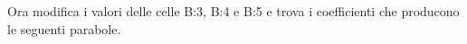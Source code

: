 \begin{comment}
\begin{procedura}
 Per far disegnare parabole ad un foglio di calcolo.
 \begin{enumerate*}
  \item Crea un nuovo foglio di calcolo e salvalo con il 
   nome~``pcoefficientiparabola''.
  \item Intestazioni varie:
   \subitem <A1>: Coefficienti della parabola
   \subitem <D1>: <menu-Inserisci-Oggetto-Formula...> ax\^{}2+bx+c
   \subitem <A3>: a
   \subitem <A3>: <Clic destro - Inserisci commento> Coefficiente termine di 
    secondo grado.
   \subitem <A4>: b
   \subitem <A4>: <Clic destro - Inserisci commento> Coefficiente termine di 
    primo grado.
   \subitem <A5>: c
   \subitem <A5>: <Clic destro - Inserisci commento> Coefficiente termine di 
    grado zero.
   \subitem <A7>: x
   \subitem <b7>: y
  \item Dati
   \subitem <B3>: -0,5
   \subitem <B4>: 1
   \subitem <B3>: 1
   \subitem <A8>: -10
   \subitem <A9>: -9,5
   \subitem seleziona <A8:A9>: una cifra decimale, 
    copia verso il basso fino a <A48>
   \subitem <B8>: =B\$3*A8\^2+B\$4*A8+B\$5 (attento ai simboli \$ che 
   indicano i
    riferimenti assoluti)
   \subitem <B8>: 3 cifre decimali, copia verso il basso fino ad <b48>
  \item Grafico
   \subitem seleziona <A8:B48>
   \subitem <menu-Inserisci-Grafico>
   \subitem XY (Dispersione), Tipo linea: Liscia, Solo linee.
   \subitem Titolo: Parabola nel piano cartesiano
   \subitem Togli la spunta a: Mostra legenda.
   \subitem Metti la spunta a Mostra griglie Asse X e Asse Y.
   \subitem Doppio clic su un numero dell'asse y: 
    <Scala> Minimo -10, Massimo 10, Intervallo principale 1;
    <Linea> Colore Nero;
    <Didascalia> togli la spunta a <Mostra didascalia>.
   \subitem Doppio clic su un numero dell'asse x: 
    <Scala> Minimo -10, Massimo 10, Intervallo principale 1;
    <Linea> Colore Nero;
    <Didascalia> togli la spunta a <Mostra didascalia>.
   \subitem Clicca fuori dal grafico, clicca sul grafico, modifica le 
    dimensioni (``maniglie'' verdi) in modo che i riquadri della griglia 
    siano quadrati.
 \end{enumerate*}
\end{procedura}
\end{comment}

\vspace{1em}
Ora modifica i valori delle celle B:3, B:4 e B:5 e trova i coefficienti che 
producono le seguenti parabole.

